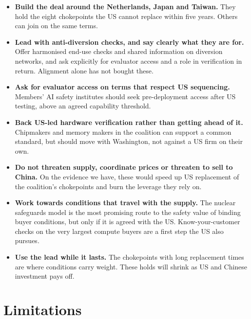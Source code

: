 \documentclass[11pt]{article}
\begin{document}
\begin{itemize}[leftmargin=*]
\item \textbf{Build the deal around the Netherlands, Japan and Taiwan.} They hold the eight chokepoints the US cannot replace within five years. Others can join on the same terms.
\item \textbf{Lead with anti-diversion checks, and say clearly what they are for.} Offer harmonised end-use checks and shared information on diversion networks, and ask explicitly for evaluator access and a role in verification in return. Alignment alone has not bought these.
\item \textbf{Ask for evaluator access on terms that respect US sequencing.} Members' AI safety institutes should seek pre-deployment access after US testing, above an agreed capability threshold.
\item \textbf{Back US-led hardware verification rather than getting ahead of it.} Chipmakers and memory makers in the coalition can support a common standard, but should move with Washington, not against a US firm on their own.
\item \textbf{Do not threaten supply, coordinate prices or threaten to sell to China.} On the evidence we have, these would speed up US replacement of the coalition's chokepoints and burn the leverage they rely on.
\item \textbf{Work towards conditions that travel with the supply.} The nuclear safeguards model is the most promising route to the safety value of binding buyer conditions, but only if it is agreed with the US. Know-your-customer checks on the very largest compute buyers are a first step the US also pursues.
\item \textbf{Use the lead while it lasts.} The chokepoints with long replacement times are where conditions carry weight. These holds will shrink as US and Chinese investment pays off.
\end{itemize}

\section{Limitations}
\end{document}
